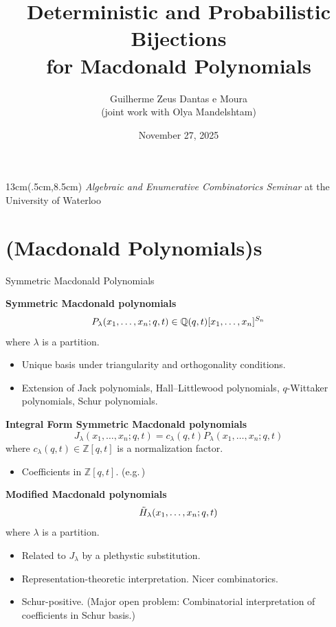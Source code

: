 \documentclass[aspectratio = 1609]{beamer}
\title[(Probabilistic) Bijections for Macdonald Polynomials]{Deterministic and Probabilistic Bijections \\ for Macdonald Polynomials}
\author[Zeus Dantas e Moura]{\texorpdfstring{Guilherme Zeus Dantas e Moura \\ {\small (joint work with Olya Mandelshtam)}}{Guilherme Zeus Dantas e Moura}}
\institute[Waterloo]{University of Waterloo}
\date{November 27, 2025}
\theoremstyle{definition}
\theoremstyle{plain} %
\begin{document}
\begin{frame}
  \titlepage

  \begin{textblock*}{13cm}(.5cm,8.5cm) %
    \small 
    \emph{Algebraic and Enumerative Combinatorics Seminar} at the University of Waterloo
  \end{textblock*}
\end{frame}

\part{(Macdonald Polynomials)s}

\begin{frame}{Symmetric Macdonald Polynomials}
  \setlength{\abovedisplayskip}{2pt}
  \setlength{\belowdisplayskip}{2pt}
  \setlength{\abovedisplayshortskip}{2pt}
  \setlength{\belowdisplayshortskip}{2pt}

  \textbf{Symmetric Macdonald polynomials} \hfill \parencite{Mac88}
  \vspace{-.5em}
  \[
    P_\lambda(x_1, \dots, x_n; q, t) \in \mathbb{Q}(q, t)[x_1, \dots, x_n]^{S_n}
    \vspace{-.5em}
  \]
  where \(\lambda\) is a partition.

  \begin{itemize}
    \small
    \item Unique basis under triangularity and orthogonality conditions.
    \item Extension of Jack polynomials, Hall--Littlewood polynomials, $q$-Wittaker polynomials, Schur polynomials.
  \end{itemize}

  \vspace{1em}
  \pause

  \textbf{Integral Form Symmetric Macdonald polynomials} \hfill \parencite{Mac04}
  \[J_\lambda(x_1, \dots, x_n; q, t) = c_\lambda(q, t) P_\lambda(x_1, \dots, x_n; q, t)\]
  where \(c_\lambda(q, t) \in \mathbb{Z}[q, t]\) is a normalization factor.
  \begin{itemize}
    \small
    \item Coefficients in \(\mathbb{Z}[q, t]\). (e.g.\,\cite{Kno97})
  \end{itemize}

  \vspace{1em}
  \pause

  \textbf{Modified Macdonald polynomials} \hfill \parencite{Hai99}
  \vspace{-.5em}
  \[
    \tilde{H}_\lambda(x_1, \dots, x_n; q, t)
    \vspace{-.5em}
  \]
  where \(\lambda\) is a partition.
  \begin{itemize}
    \small
    \item Related to \(J_\lambda\) by a plethystic substitution.
    \item Representation-theoretic interpretation. Nicer combinatorics.
    \item Schur-positive. (Major open problem: Combinatorial interpretation of coefficients in Schur basis.)
  \end{itemize}
\end{frame}
\end{document}
